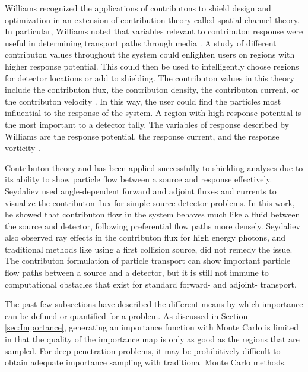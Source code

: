 Williams recognized the applications of contributons to
shield design and optimization 
 in an extension of contribution theory called
spatial channel theory. In particular, Williams noted that variables
relevant to contributon response were useful in determining transport paths
through media \cite{williams_contributon_study, williams_SCC_shielding}. A study
of different contributon values throughout the system could enlighten users on
regions with higher response potential. This could then be used to intelligently
choose regions for detector locations or add to shielding.
The contributon values in this theory include the contributon flux, the
contributon density, the contributon current, or the contributon velocity
\cite{williams_relations_1977}.
In this way, the
user could find the particles most influential to the response of the system. A
region with high response potential is the most important to a detector tally. The
variables of response described by Williams are the response potential, the
response current, and the response vorticity \cite{williams_contributorn_1992}.

Contributon theory and has been applied successfully to
shielding analyses \cite{seydaliev_contributon_2008, williams_SCC_shielding} due
to its ability to show particle flow between a source and response effectively.
Seydaliev \cite{seydaliev_contributon_2008} used angle-dependent forward and
adjoint
fluxes and currents to visualize the contributon flux for
simple source-detector problems. In this work, he showed that contributon flow
in the system behaves much like a fluid between the source and detector,
following preferential flow paths more densely.
Seydaliev also observed ray effects in the
contributon flux for high energy photons, and traditional methods like using a
first collision source, did not remedy the issue. The contributon formulation of
particle transport can show important particle flow paths between a source and a
detector, but it is still not immune to computational obstacles that exist for
standard forward- and adjoint- transport.

The past few subsections have described the different means by which importance
can be defined or quantified for a problem.
As discussed in Section \ref{sec:Importance}, generating an importance function
with Monte Carlo is limited in that the quality of the importance map is only as
good as the regions that are sampled. For deep-penetration problems, it may be
prohibitively difficult to obtain adequate importance sampling with traditional
Monte Carlo methods. 

